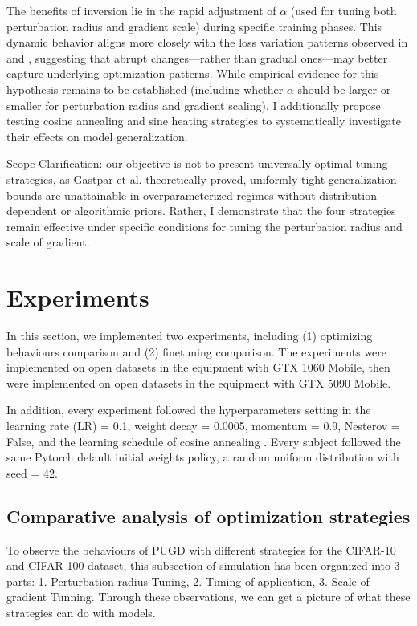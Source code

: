 \documentclass[10pt,twocolumn,letterpaper]{article}
\begin{document}
The benefits of inversion lie in the rapid adjustment of $\alpha$ (used for tuning both perturbation radius and gradient scale) during specific training phases. This dynamic behavior aligns more closely with the loss variation patterns observed in  and , suggesting that abrupt changes—rather than gradual ones—may better capture underlying optimization patterns. While empirical evidence for this hypothesis remains to be established (including whether $\alpha$ should be larger or smaller for perturbation radius and gradient scaling), I additionally propose testing cosine annealing and sine heating strategies to systematically investigate their effects on model generalization.

Scope Clarification: our objective is not to present universally optimal tuning strategies, as Gastpar et al. \cite{gastpar2023fantasticgeneralizationmeasures} theoretically proved, uniformly tight generalization bounds are unattainable in overparameterized regimes without distribution-dependent or algorithmic priors. Rather, I demonstrate that the four strategies remain effective under specific conditions for tuning the perturbation radius and scale of gradient.

\section{Experiments}
\label{sec:4}
In this section, we implemented two experiments, including (1) optimizing behaviours comparison and (2) finetuning comparison. The experiments were implemented on open datasets in the equipment with GTX 1060 Mobile, then were implemented on open datasets in the equipment with GTX 5090 Mobile.

In addition, every experiment followed the hyperparameters setting in the learning rate (LR)	= 0.1, weight decay = 0.0005, momentum = 0.9, Nesterov = False, and the learning schedule of cosine annealing \cite{loshchilov2017sgdrstochasticgradientdescent}. Every subject followed the same Pytorch 
default initial weights policy, a random uniform distribution with seed = 42. 

\subsection{Comparative analysis of optimization strategies}
\label{subsec:4.1}
To observe the behaviours of PUGD with different strategies for the CIFAR-10 and CIFAR-100 dataset, this subsection of simulation has been organized into 3-parts:  
1. Perturbation radius Tuning, 2. Timing of application, 3. Scale of gradient Tunning. Through these observations, we can get a picture of what these strategies can do with models. 
\end{document}
